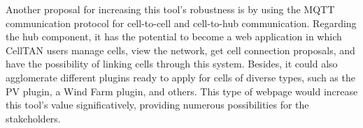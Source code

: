 Another proposal for increasing this tool's robustness is by using the MQTT communication protocol for cell-to-cell and cell-to-hub communication. Regarding the hub component, it has the potential to become a web application in which CellTAN users manage cells, view the network, get cell connection proposals, and have the possibility of linking cells through this system. Besides, it could also agglomerate different plugins ready to apply for cells of diverse types, such as the PV plugin, a Wind Farm plugin, and others. This type of webpage would increase this tool's value significatively, providing numerous possibilities for the stakeholders.

